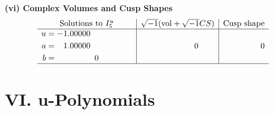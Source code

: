 \documentclass[1p]{elsarticle_modified}
\theoremstyle{definition}
\newcommand{\I}{\sqrt{-1}}
\begin{document}
\newpage\flushleft \textbf{(vi) Complex Volumes and Cusp Shapes}
$$\begin{array}{c|c|c}  
\text{Solutions to }I^u_{5}& \I (\text{vol} + \sqrt{-1}CS) & \text{Cusp shape}\\
 \hline 
\begin{aligned}
u &= -1.00000\phantom{ +0.000000I} \\
a &= \phantom{-}1.00000\phantom{ +0.000000I} \\
b &= \phantom{-0.000000 } 0\end{aligned}
 & \phantom{-0.000000 } 0 & \phantom{-0.000000 } 0\\
 \hline 
 \end{array}$$\newpage
\newpage\renewcommand{\arraystretch}{1}
\centering \section*{ VI. u-Polynomials}
\end{document}
